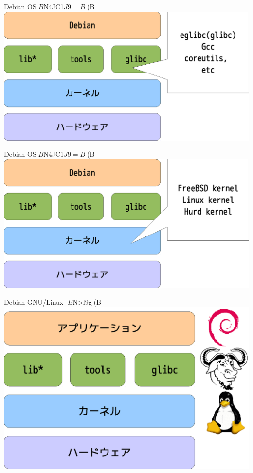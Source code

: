 {\begin{frame}{Debian OS$B$N4JC1$J9=B$(B}
\includegraphics[width=1.0\hsize]{image201006/os-block01-2.eps}
\end{frame}


\begin{frame}{Debian OS$B$N4JC1$J9=B$(B}
\includegraphics[width=1.0\hsize]{image201006/os-block01-3.eps}
\end{frame}


\begin{frame}{Debian GNU/Linux $B$N>l9g(B}
\includegraphics[width=0.8\hsize]{image201006/os-block02.eps}
\end{frame}

}
